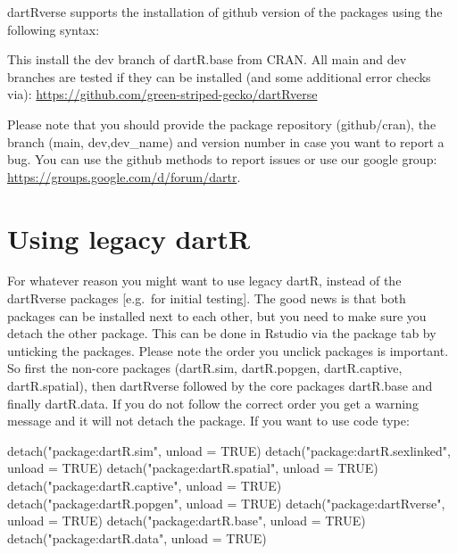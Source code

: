 \documentclass[
  letterpaper,
  DIV=11,
  numbers=noendperiod]{scrreprt}
\newenvironment{Shaded}{\begin{snugshade}}{\end{snugshade}}
\newcommand{\AttributeTok}[1]{\textcolor[rgb]{0.49,0.56,0.16}{#1}}
\newcommand{\ConstantTok}[1]{\textcolor[rgb]{0.53,0.00,0.00}{#1}}
\newcommand{\FunctionTok}[1]{\textcolor[rgb]{0.02,0.16,0.49}{#1}}
\newcommand{\NormalTok}[1]{\textcolor[rgb]{0.00,0.44,0.13}{#1}}
\newcommand{\StringTok}[1]{\textcolor[rgb]{0.25,0.44,0.63}{#1}}
\let\textttOrig\texttt
\renewcommand{\texttt}[1]{\textttOrig{\color{blue}{#1}}}
\begin{document}
dartRverse supports the installation of github version of the packages
using the following syntax:

\texttt{dartRverse\_install(package\ =\ "dartR.base,\ repo\ =\ "github",\ branch\ =\ "dev")}

This install the dev branch of dartR.base from CRAN. All main and dev
branches are tested if they can be installed (and some additional error
checks via): \url{https://github.com/green-striped-gecko/dartRverse}

Please note that you should provide the package repository
(github/cran), the branch (main, dev,dev\_name) and version number in
case you want to report a bug. You can use the github methods to report
issues or use our google group:
\url{https://groups.google.com/d/forum/dartr}.

\hypertarget{using-legacy-dartr}{%
\section*{Using legacy dartR}\label{using-legacy-dartr}}


For whatever reason you might want to use legacy dartR, instead of the
dartRverse packages {[}e.g.~for initial testing{]}. The good news is
that both packages can be installed next to each other, but you need to
make sure you detach the other package. This can be done in Rstudio via
the package tab by unticking the packages. Please note the order you
unclick packages is important. So first the non-core packages
(dartR.sim, dartR.popgen, dartR.captive, dartR.spatial), then dartRverse
followed by the core packages dartR.base and finally dartR.data. If you
do not follow the correct order you get a warning message and it will
not detach the package. If you want to use code type:

\begin{Shaded}
\begin{Highlighting}[]
\FunctionTok{detach}\NormalTok{(}\StringTok{"package:dartR.sim"}\NormalTok{, }\AttributeTok{unload =} \ConstantTok{TRUE}\NormalTok{)}
\FunctionTok{detach}\NormalTok{(}\StringTok{"package:dartR.sexlinked"}\NormalTok{, }\AttributeTok{unload =} \ConstantTok{TRUE}\NormalTok{)}
\FunctionTok{detach}\NormalTok{(}\StringTok{"package:dartR.spatial"}\NormalTok{, }\AttributeTok{unload =} \ConstantTok{TRUE}\NormalTok{)}
\FunctionTok{detach}\NormalTok{(}\StringTok{"package:dartR.captive"}\NormalTok{, }\AttributeTok{unload =} \ConstantTok{TRUE}\NormalTok{)}
\FunctionTok{detach}\NormalTok{(}\StringTok{"package:dartR.popgen"}\NormalTok{, }\AttributeTok{unload =} \ConstantTok{TRUE}\NormalTok{)}
\FunctionTok{detach}\NormalTok{(}\StringTok{"package:dartRverse"}\NormalTok{, }\AttributeTok{unload =} \ConstantTok{TRUE}\NormalTok{)}
\FunctionTok{detach}\NormalTok{(}\StringTok{"package:dartR.base"}\NormalTok{, }\AttributeTok{unload =} \ConstantTok{TRUE}\NormalTok{)}
\FunctionTok{detach}\NormalTok{(}\StringTok{"package:dartR.data"}\NormalTok{, }\AttributeTok{unload =} \ConstantTok{TRUE}\NormalTok{)}
\end{Highlighting}
\end{Shaded}
\end{document}
